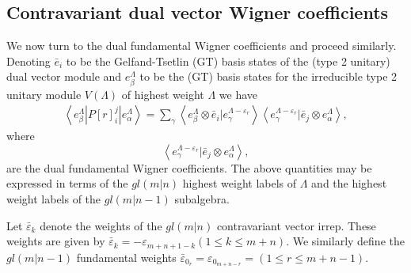 \documentclass[12pt]{article}
\begin{document}
\subsection{Contravariant dual vector Wigner coefficients}

We now turn to the dual fundamental Wigner coefficients and proceed similarly. 
Denoting $\bar{e}_i$ to be the Gelfand-Tsetlin (GT) basis states of the (type 2 unitary) dual vector module and ${e^\Lambda_\beta}$ to be the (GT) basis states for the irreducible type 2 unitary module $V(\Lambda)$ of highest weight $\Lambda$ we have 
\begin{align}
\left\langle e^\Lambda_\beta | P[r]^j_i | e^{\Lambda}_\alpha \right\rangle =
\sum_\gamma \left\langle e^\Lambda_\beta \otimes \bar{e}_i | e^{\Lambda - \varepsilon_r}_\gamma \right\rangle
\left\langle e^{\Lambda-\varepsilon_r}_\gamma | \bar{e}_j \otimes e^\Lambda_\alpha \right\rangle, \label{Pij}
\end{align}
where
$$
\left\langle e^{\Lambda-\varepsilon_r}_\gamma | \bar{e}_j \otimes e^\Lambda_\alpha \right\rangle,
$$
are the dual fundamental Wigner coefficients. The above quantities may be expressed in terms of the $gl(m|n)$ highest weight labels of $\Lambda$ and the highest weight labels of the $gl(m|n-1)$ subalgebra.

Let $\bar{\varepsilon}_k$ denote the weights of the $gl(m|n)$ contravariant vector irrep. These weights are given by $\bar{\varepsilon}_k = -\varepsilon_{m+n+1-k} (1 \leq k \leq m+n)$. We similarly define the $gl(m|n-1)$ fundamental weights $\bar{\varepsilon}_{0_r} =
\varepsilon_{0_{m+n-r}} = (1 \leq r \leq m+n-1) $.
\end{document}
